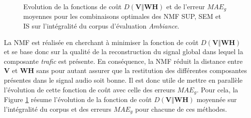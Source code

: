 \begin{figure}[h!]
\centering
{}%
\qquad
{}%
\caption{Evolution de la fonctions de coût $D(\mathbf{V}\Vert \mathbf{WH})$ et de l'erreur $MAE_g$ moyennes pour les combinaisons optimales des NMF SUP, SEM et IS sur l'intégralité du corpus d'évaluation \textit{Ambiance}.}
\label{fig:amb_cost_mae}
\end{figure}

La NMF est réalisée en cherchant à minimiser la fonction de coût $D(\mathbf{V}\Vert \mathbf{WH})$ et se base donc sur la qualité de la reconstruction du signal global dans lequel la composante \textit{trafic} est présente. En conséquence, la NMF réduit la distance entre $\mathbf{V}$ et $\mathbf{WH}$ sans pour autant assurer que la restitution des différentes composantes présentes dans le signal audio soit bonne.
Il est donc utile de mettre en parallèle l'évolution de cette fonction de coût avec celle des erreurs $MAE_g$. 
Pour cela, la Figure \ref{fig:amb_cost_mae} résume l'évolution de la fonction de coût $D(\mathbf{V}\Vert \mathbf{WH})$ moyennée sur l'intégralité du corpus et des erreurs $MAE_g$ pour chacune de ces méthodes. 

